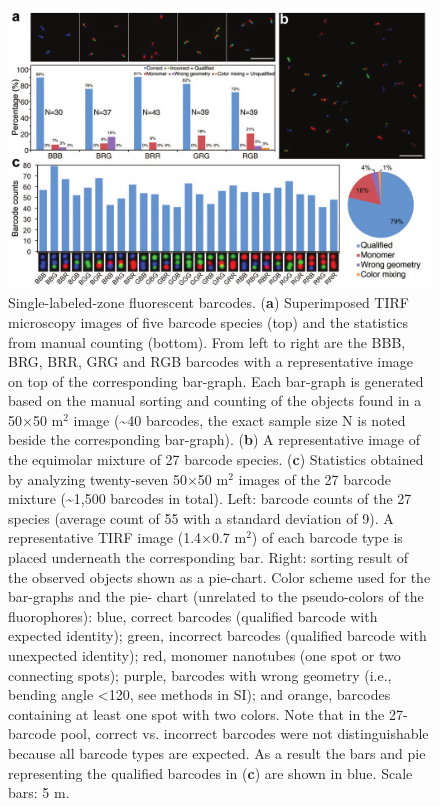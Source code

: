 \begin{figure} %
\includegraphics[width=\textwidth]{figures/dna2}
\caption[Single-labeled-zone fluorescent barcodes.]{Single-labeled-zone fluorescent barcodes. (\textbf{a}) Superimposed TIRF microscopy 
images of five barcode species (top) and the statistics from manual counting (bottom). 
From left to right are the BBB, BRG, BRR, GRG and RGB barcodes with a 
representative image on top of the corresponding bar-graph. Each bar-graph is generated 
based on the manual sorting and counting of the objects found in a 50×50 \textmu m$^2$ image 
(\textasciitilde40 barcodes, the exact sample size N is noted beside the corresponding bar-graph). (\textbf{b}) 
A representative image of the equimolar mixture of 27 barcode species. (\textbf{c}) Statistics 
obtained by analyzing twenty-seven 50×50 \textmu m$^2$ images of the 27 barcode mixture 
(\textasciitilde1,500 barcodes in total). Left: barcode counts of the 27 species (average count of 55 
with a standard deviation of 9). A representative TIRF image (1.4×0.7 \textmu m$^2$) of each 
barcode type is placed underneath the corresponding bar. Right: sorting result of the 
observed objects shown as a pie-chart. Color scheme used for the bar-graphs and the pie- 
chart (unrelated to the pseudo-colors of the fluorophores): blue, correct barcodes 
(qualified barcode with expected identity); green, incorrect barcodes (qualified barcode 
with unexpected identity); red, monomer nanotubes (one spot or two connecting spots); 
purple, barcodes with wrong geometry (i.e., bending angle <120\textdegree, see methods in SI); 
and orange, barcodes containing at least one spot with two colors. Note that in the 27- 
barcode pool, correct vs. incorrect barcodes were not distinguishable because all barcode 
types are expected. As a result the bars and pie representing the qualified barcodes in (\textbf{c}) 
are shown in blue. Scale bars: 5 \textmu m.\label{fig:dna2}}
\end{figure}
	



